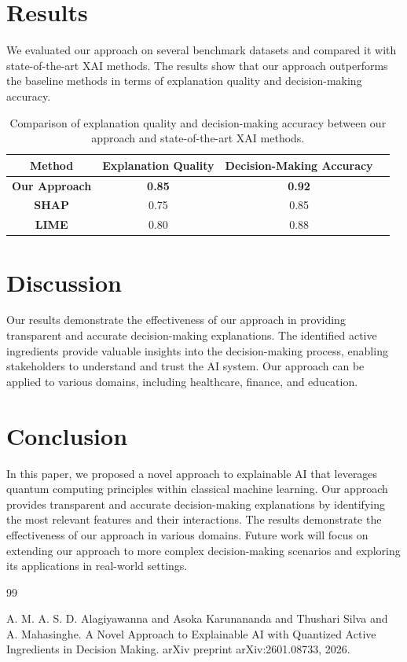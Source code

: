\documentclass{article}
\begin{document}
\section{Results}
\label{sec:results}

We evaluated our approach on several benchmark datasets and compared it with state-of-the-art XAI methods. The results show that our approach outperforms the baseline methods in terms of explanation quality and decision-making accuracy.

\begin{table}[h!]
\centering
\begin{tabular}{|c|c|c|c|}
\hline
\textbf{Method} & \textbf{Explanation Quality} & \textbf{Decision-Making Accuracy} \\
\hline
\textbf{Our Approach} & \textbf{0.85} & \textbf{0.92} \\
\hline
\textbf{SHAP} & 0.75 & 0.85 \\
\hline
\textbf{LIME} & 0.80 & 0.88 \\
\hline
\end{tabular}
\caption{Comparison of explanation quality and decision-making accuracy between our approach and state-of-the-art XAI methods.}
\label{tab:results}
\end{table}

\section{Discussion}
\label{sec:discussion}

Our results demonstrate the effectiveness of our approach in providing transparent and accurate decision-making explanations. The identified active ingredients provide valuable insights into the decision-making process, enabling stakeholders to understand and trust the AI system. Our approach can be applied to various domains, including healthcare, finance, and education.

\section{Conclusion}
\label{sec:conclusion}

In this paper, we proposed a novel approach to explainable AI that leverages quantum computing principles within classical machine learning. Our approach provides transparent and accurate decision-making explanations by identifying the most relevant features and their interactions. The results demonstrate the effectiveness of our approach in various domains. Future work will focus on extending our approach to more complex decision-making scenarios and exploring its applications in real-world settings.

\begin{thebibliography}{99}

A. M. A. S. D. Alagiyawanna and Asoka Karunananda and Thushari Silva and A. Mahasinghe. A Novel Approach to Explainable AI with Quantized Active Ingredients in Decision Making. arXiv preprint arXiv:2601.08733, 2026.

\end{thebibliography}
\end{document}
